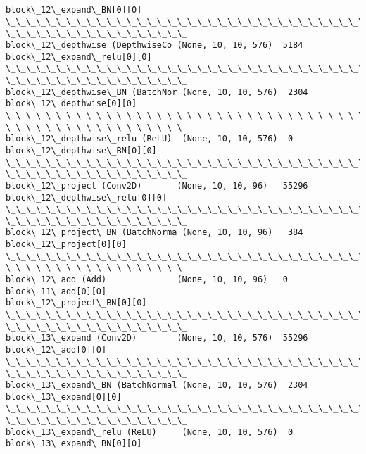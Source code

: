 \documentclass[11pt]{article}
\begin{document}
\begin{Verbatim}[commandchars=\\\{\}]
block\_12\_expand\_BN[0][0]
\_\_\_\_\_\_\_\_\_\_\_\_\_\_\_\_\_\_\_\_\_\_\_\_\_\_\_\_\_\_\_\_\_\_\_\_\_\_\_\_\_\_\_\_\_\_\_\_\_\_\_\_\_\_\_\_\_\_\_\_\_\_\_\_\_\_\_\_\_\_\_\_\_\_\_\_\_\_\_\_
\_\_\_\_\_\_\_\_\_\_\_\_\_\_\_\_\_\_
block\_12\_depthwise (DepthwiseCo (None, 10, 10, 576)  5184
block\_12\_expand\_relu[0][0]
\_\_\_\_\_\_\_\_\_\_\_\_\_\_\_\_\_\_\_\_\_\_\_\_\_\_\_\_\_\_\_\_\_\_\_\_\_\_\_\_\_\_\_\_\_\_\_\_\_\_\_\_\_\_\_\_\_\_\_\_\_\_\_\_\_\_\_\_\_\_\_\_\_\_\_\_\_\_\_\_
\_\_\_\_\_\_\_\_\_\_\_\_\_\_\_\_\_\_
block\_12\_depthwise\_BN (BatchNor (None, 10, 10, 576)  2304
block\_12\_depthwise[0][0]
\_\_\_\_\_\_\_\_\_\_\_\_\_\_\_\_\_\_\_\_\_\_\_\_\_\_\_\_\_\_\_\_\_\_\_\_\_\_\_\_\_\_\_\_\_\_\_\_\_\_\_\_\_\_\_\_\_\_\_\_\_\_\_\_\_\_\_\_\_\_\_\_\_\_\_\_\_\_\_\_
\_\_\_\_\_\_\_\_\_\_\_\_\_\_\_\_\_\_
block\_12\_depthwise\_relu (ReLU)  (None, 10, 10, 576)  0
block\_12\_depthwise\_BN[0][0]
\_\_\_\_\_\_\_\_\_\_\_\_\_\_\_\_\_\_\_\_\_\_\_\_\_\_\_\_\_\_\_\_\_\_\_\_\_\_\_\_\_\_\_\_\_\_\_\_\_\_\_\_\_\_\_\_\_\_\_\_\_\_\_\_\_\_\_\_\_\_\_\_\_\_\_\_\_\_\_\_
\_\_\_\_\_\_\_\_\_\_\_\_\_\_\_\_\_\_
block\_12\_project (Conv2D)       (None, 10, 10, 96)   55296
block\_12\_depthwise\_relu[0][0]
\_\_\_\_\_\_\_\_\_\_\_\_\_\_\_\_\_\_\_\_\_\_\_\_\_\_\_\_\_\_\_\_\_\_\_\_\_\_\_\_\_\_\_\_\_\_\_\_\_\_\_\_\_\_\_\_\_\_\_\_\_\_\_\_\_\_\_\_\_\_\_\_\_\_\_\_\_\_\_\_
\_\_\_\_\_\_\_\_\_\_\_\_\_\_\_\_\_\_
block\_12\_project\_BN (BatchNorma (None, 10, 10, 96)   384
block\_12\_project[0][0]
\_\_\_\_\_\_\_\_\_\_\_\_\_\_\_\_\_\_\_\_\_\_\_\_\_\_\_\_\_\_\_\_\_\_\_\_\_\_\_\_\_\_\_\_\_\_\_\_\_\_\_\_\_\_\_\_\_\_\_\_\_\_\_\_\_\_\_\_\_\_\_\_\_\_\_\_\_\_\_\_
\_\_\_\_\_\_\_\_\_\_\_\_\_\_\_\_\_\_
block\_12\_add (Add)              (None, 10, 10, 96)   0
block\_11\_add[0][0]
block\_12\_project\_BN[0][0]
\_\_\_\_\_\_\_\_\_\_\_\_\_\_\_\_\_\_\_\_\_\_\_\_\_\_\_\_\_\_\_\_\_\_\_\_\_\_\_\_\_\_\_\_\_\_\_\_\_\_\_\_\_\_\_\_\_\_\_\_\_\_\_\_\_\_\_\_\_\_\_\_\_\_\_\_\_\_\_\_
\_\_\_\_\_\_\_\_\_\_\_\_\_\_\_\_\_\_
block\_13\_expand (Conv2D)        (None, 10, 10, 576)  55296
block\_12\_add[0][0]
\_\_\_\_\_\_\_\_\_\_\_\_\_\_\_\_\_\_\_\_\_\_\_\_\_\_\_\_\_\_\_\_\_\_\_\_\_\_\_\_\_\_\_\_\_\_\_\_\_\_\_\_\_\_\_\_\_\_\_\_\_\_\_\_\_\_\_\_\_\_\_\_\_\_\_\_\_\_\_\_
\_\_\_\_\_\_\_\_\_\_\_\_\_\_\_\_\_\_
block\_13\_expand\_BN (BatchNormal (None, 10, 10, 576)  2304
block\_13\_expand[0][0]
\_\_\_\_\_\_\_\_\_\_\_\_\_\_\_\_\_\_\_\_\_\_\_\_\_\_\_\_\_\_\_\_\_\_\_\_\_\_\_\_\_\_\_\_\_\_\_\_\_\_\_\_\_\_\_\_\_\_\_\_\_\_\_\_\_\_\_\_\_\_\_\_\_\_\_\_\_\_\_\_
\_\_\_\_\_\_\_\_\_\_\_\_\_\_\_\_\_\_
block\_13\_expand\_relu (ReLU)     (None, 10, 10, 576)  0
block\_13\_expand\_BN[0][0]

\end{Verbatim}
\end{document}

